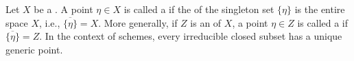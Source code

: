 \begin{definition} \label{definition:generic_point_of_a_topological_space}
Let $X$ be a . A point $\eta \in X$ is called a  if the  of the singleton set $\{\eta\}$ is the entire space $X$, i.e., $\overline{\{\eta\}} = X$. More generally, if $Z$ is an   of $X$, a point $\eta \in Z$ is called a  if $\overline{\{\eta\}} = Z$. In the context of schemes, every irreducible closed subset has a unique generic point.
\end{definition}